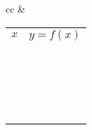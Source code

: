 


\renewcommand{\metaHeaderLine}{Koordinatensysteme}



\begin{tabular}{cc}
   & \begin{tabular}{c|c}
    $x$ & $y=f(x)$\\
    &  \\
    \hline
    &  \\
    \hline
    &  \\
    \hline
    &  \\
    \hline
    &  \\
    \hline
    &  \\
    \hline
    &  \\
    \hline
    &  \\
    \hline
    &  \\
    \hline
    &  \\
    \hline
    &  \\
    \hline
    &  \\
    \hline
    &  \\
    \hline
    &  \\
    \hline
    &  \\
    \hline
    &  \\
    \hline
    &  \\
    \hline
    &  \\
    \hline
    &  \\
    \hline
    
  \end{tabular}\\
\end{tabular}


